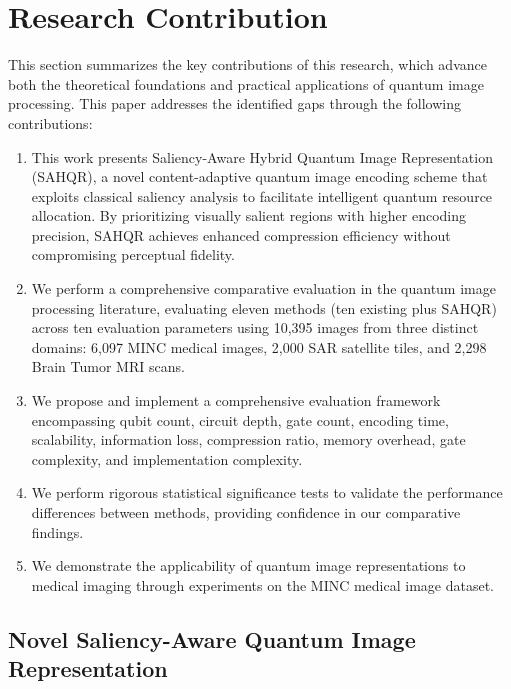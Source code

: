\documentclass[pdflatex,sn-mathphys-num,Numbered]{sn-jnl}
\theoremstyle{thmstyleone}
\theoremstyle{thmstyletwo}
\theoremstyle{thmstylethree}
\begin{document}

\section{Research Contribution}\label{sec:contribution}

This section summarizes the key contributions of this research, which advance both the theoretical foundations and practical applications of quantum image processing. This paper addresses the identified gaps through the following contributions:

\begin{enumerate}
\item This work presents Saliency-Aware Hybrid Quantum Image Representation (SAHQR), a novel content-adaptive quantum image encoding scheme that exploits classical saliency analysis to facilitate intelligent quantum resource allocation. By prioritizing visually salient regions with higher encoding precision, SAHQR achieves enhanced compression efficiency without compromising perceptual fidelity.

\item We perform a comprehensive comparative evaluation in the quantum image processing literature, evaluating eleven methods (ten existing plus SAHQR) across ten evaluation parameters using 10,395 images from three distinct domains: 6,097 MINC medical images, 2,000 SAR satellite tiles, and 2,298 Brain Tumor MRI scans.

\item We propose and implement a comprehensive evaluation framework encompassing qubit count, circuit depth, gate count, encoding time, scalability, information loss, compression ratio, memory overhead, gate complexity, and implementation complexity.

\item We perform rigorous statistical significance tests to validate the performance differences between methods, providing confidence in our comparative findings.

\item We demonstrate the applicability of quantum image representations to medical imaging through experiments on the MINC medical image dataset.
\end{enumerate}


\subsection{Novel Saliency-Aware Quantum Image Representation}
\end{document}
